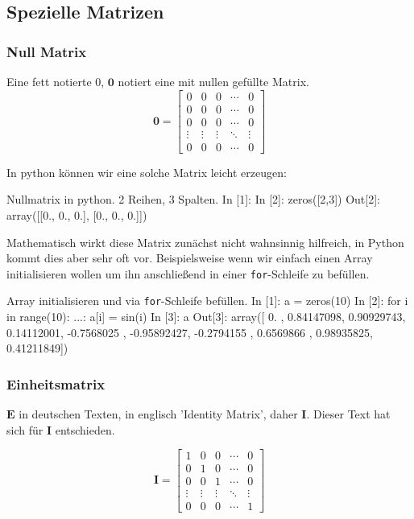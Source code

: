 \subsection{Spezielle Matrizen}

\subsubsection*{Null Matrix}
Eine fett notierte 0, $\mathbf{0}$ notiert eine mit nullen gefüllte Matrix.
\begin{equation}
\mathbf{0} =
\begin{bmatrix}
0 & 0 & 0 & \cdots & 0 \\
0 & 0 & 0 & \cdots & 0 \\
0 & 0 & 0 & \cdots & 0 \\
\vdots & \vdots & \vdots & \ddots & \vdots \\
0 & 0 & 0 & \cdots & 0
\end{bmatrix}
\end{equation} 

In python können wir eine solche Matrix leicht erzeugen:
\begin{python}{Nullmatrix in python. 2 Reihen, 3 Spalten.}
In [1]: %
In [2]: zeros([2,3])
Out[2]:
array([[0., 0., 0.],
       [0., 0., 0.]])
\end{python}

Mathematisch wirkt diese Matrix zunächst nicht wahnsinnig hilfreich, in Python kommt dies aber sehr oft vor. Beispielsweise wenn wir einfach einen Array initialisieren wollen um ihn anschließend in einer \texttt{for}-Schleife zu befüllen. 

\begin{python}{Array initialisieren und via \texttt{for}-Schleife befüllen.}
In [1]: a = zeros(10)
In [2]: for i in range(10):
   ...:     a[i] = sin(i)
In [3]: a
Out[3]:
array([ 0.        ,  0.84147098,  0.90929743,  0.14112001, -0.7568025 ,
       -0.95892427, -0.2794155 ,  0.6569866 ,  0.98935825,  0.41211849])
\end{python}

\subsubsection*{Einheitsmatrix}

$\mathbf{E}$ in deutschen Texten, in englisch 'Identity Matrix', daher $\mathbf{I}$. Dieser Text hat sich für $\mathbf{I}$ entschieden.

\begin{equation}
\mathbf{I} =
\begin{bmatrix}
1 & 0 & 0 & \cdots & 0 \\
0 & 1 & 0 & \cdots & 0 \\
0 & 0 & 1 & \cdots & 0 \\
\vdots & \vdots & \vdots & \ddots & \vdots \\
0 & 0 & 0 & \cdots & 1
\end{bmatrix}
\end{equation} 


